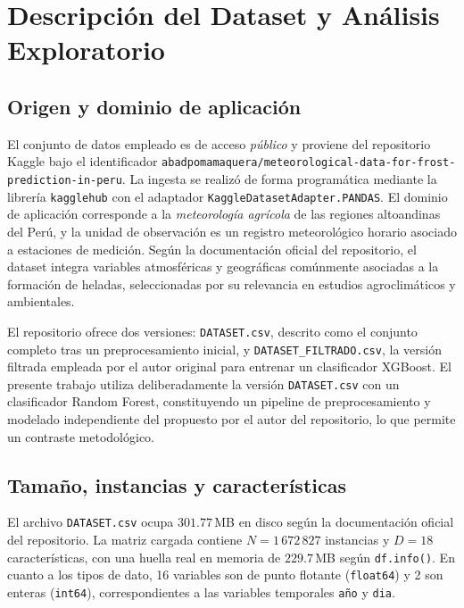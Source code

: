 \section{Descripción del Dataset y Análisis Exploratorio}\label{sec:dataset}

\subsection{Origen y dominio de aplicación}
El conjunto de datos empleado es de acceso \emph{público} y proviene del
repositorio Kaggle bajo el identificador
\texttt{abadpomamaquera/meteorological-data-for-frost-prediction-in-peru}. La
ingesta se realizó de forma programática mediante la librería \texttt{kagglehub}
con el adaptador \texttt{KaggleDatasetAdapter.PANDAS}. El dominio de aplicación
corresponde a la \emph{meteorología agrícola} de las regiones altoandinas del
Perú, y la unidad de observación es un registro meteorológico horario asociado a
estaciones de medición. Según la documentación oficial del repositorio, el
dataset integra variables atmosféricas y geográficas comúnmente asociadas a la
formación de heladas, seleccionadas por su relevancia en estudios agroclimáticos
y ambientales.

El repositorio ofrece dos versiones: \texttt{DATASET.csv}, descrito como el
conjunto completo tras un preprocesamiento inicial, y
\texttt{DATASET\_FILTRADO.csv}, la versión filtrada empleada por el autor
original para entrenar un clasificador XGBoost. El presente trabajo utiliza
deliberadamente la versión \texttt{DATASET.csv} con un clasificador Random Forest,
constituyendo un pipeline de preprocesamiento y modelado independiente del
propuesto por el autor del repositorio, lo que permite un contraste metodológico.

\subsection{Tamaño, instancias y características}
El archivo \texttt{DATASET.csv} ocupa $301.77$\,MB en disco según la
documentación oficial del repositorio. La matriz cargada contiene
$N = 1\,672\,827$ instancias y $D = 18$ características, con una huella real en
memoria de $229.7$\,MB según \texttt{df.info()}. En cuanto a los tipos de dato,
16 variables son de punto flotante (\texttt{float64}) y 2 son enteras
(\texttt{int64}), correspondientes a las variables temporales \texttt{año} y
\texttt{dia}.


